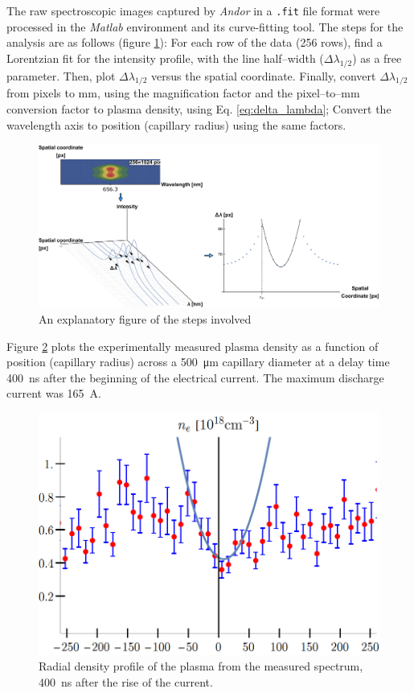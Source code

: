 \documentclass[../main.tex]{subfiles}
\begin{document}
The raw spectroscopic images captured by \textit{Andor} in a \texttt{.fit} file format were processed in the \textit{Matlab} environment and its curve-fitting tool. The steps for the analysis are as follows (figure \ref{fig:spectra_analysis}): For each row of the data (256 rows), find a Lorentzian fit for the intensity profile, with the line half--width ($\Delta\lambda_{1/2}$) as a free parameter. Then, plot $\Delta\lambda_{1/2}$ versus the spatial coordinate. Finally, convert $\Delta\lambda_{1/2}$ from pixels to \si{\mm}, using the magnification factor and the pixel--to--mm conversion factor to plasma density, using Eq. \ref{eq:delta_lambda}; Convert the wavelength axis to position (capillary radius) using the same factors.
\begin{figure}
    \centering
    \includegraphics[width=\textwidth]{figures/spectro/spectra_analysis.pdf}
    \caption{An explanatory figure of the steps involved}
    \label{fig:spectra_analysis}
\end{figure}

Figure \ref{fig:plasma_channel_spectro} plots the experimentally measured plasma density as a function of position (capillary radius) across a \SI{500}{\um} capillary diameter at a delay time \SI{400}{\ns} after the beginning of the electrical current. The maximum discharge current was \SI{165}{\A}.

\begin{figure}
\centering
\includegraphics[width=\textwidth]{figures/spectro/parabolic.png}
\caption{Radial density profile of the plasma from the measured spectrum, \SI{400}{\ns} after the rise of the current.}
\label{fig:plasma_channel_spectro}
\end{figure}
\end{document}
